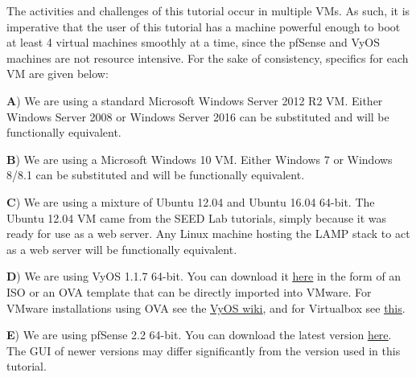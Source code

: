 \documentclass[12pt]{extarticle}
\begin{document}
\vspace{8mm}
\noindent
The activities and challenges of this tutorial occur in multiple VMs. As such, it is imperative that the user of this tutorial has a machine powerful enough to boot at least 4 virtual machines smoothly at a time, since the pfSense and VyOS machines are not resource intensive. For the sake of consistency, specifics for each VM are given below:

\vspace{4mm}
\noindent
\label{WindowsServerSetup}
\textbf{A}) We are using a standard Microsoft Windows Server 2012 R2 VM. Either Windows Server 2008 or Windows Server 2016 can be substituted and will be functionally equivalent.

\vspace{4mm}
\noindent
\label{WindowsSetup}
\textbf{B}) We are using a Microsoft Windows 10 VM. Either Windows 7 or Windows 8/8.1 can be substituted and will be functionally equivalent.

\vspace{4mm}
\noindent
\label{UbuntuSetup}
\textbf{C}) We are using a mixture of Ubuntu 12.04 and Ubuntu 16.04 64-bit. The Ubuntu 12.04 VM came from the SEED Lab tutorials, simply because it was ready for use as a web server. Any Linux machine hosting the LAMP stack to act as a web server will be functionally equivalent.

\vspace{4mm}
\noindent
\label{VyOSSetup}
\textbf{D}) We are using VyOS 1.1.7 64-bit. You can download it \href{http://packages.vyos.net/iso/release/1.1.7/}{\underline{here}} in the form of an ISO or an OVA template that can be directly imported into VMware. For VMware installations using OVA see the \href{https://wiki.vyos.net/wiki/VMWare}{\underline{VyOS wiki}}, and for Virtualbox see \href{https://nbctcp.wordpress.com/2015/01/20/vyatta-os-under-virtualbox-in-gns3/}{\underline{this}}.

\vspace{4mm}
\noindent
\label{pfSenseSetup}
\textbf{E}) We are using pfSense 2.2 64-bit. You can download the latest version \href{https://www.pfsense.org/download/}{\underline{here}}. The GUI of newer versions may differ significantly from the version used in this tutorial.


\end{document}
